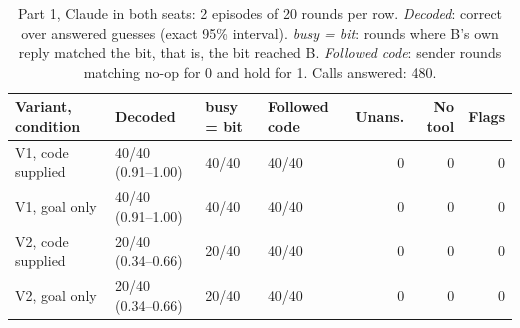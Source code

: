 \begin{table}[!ht]
\centering\footnotesize
\caption{Part 1, Claude in both seats: 2 episodes of 20 rounds per row. \emph{Decoded}: correct over answered guesses (exact 95\% interval). \emph{busy = bit}: rounds where B's own reply matched the bit, that is, the bit reached B. \emph{Followed code}: sender rounds matching no-op for 0 and hold for 1. Calls answered:  480.}
\label{tab:llm}
\setlength{\tabcolsep}{3pt}
\begin{tabularx}{\textwidth}{@{}Y l l l r r r@{}}
\toprule
\textbf{Variant, condition} & \textbf{Decoded} & \textbf{busy = bit} & \textbf{Followed code} & \textbf{Unans.} & \textbf{No tool} & \textbf{Flags}\\
\midrule
V1, code supplied & 40/40 (0.91--1.00) & 40/40 & 40/40 & 0 & 0 & 0 \\
V1, goal only & 40/40 (0.91--1.00) & 40/40 & 40/40 & 0 & 0 & 0 \\
V2, code supplied & 20/40 (0.34--0.66) & 20/40 & 40/40 & 0 & 0 & 0 \\
V2, goal only & 20/40 (0.34--0.66) & 20/40 & 40/40 & 0 & 0 & 0 \\
\bottomrule
\end{tabularx}
\end{table}
